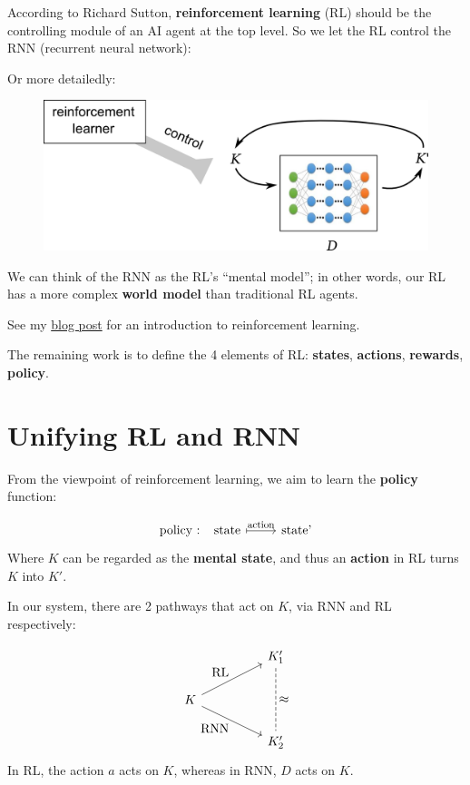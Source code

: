 \documentclass[12pt]{article}
\begin{document}
According to Richard Sutton, \textbf{reinforcement learning} (RL) should be the controlling module of an AI agent at the top level.  So we let the RL control the RNN (recurrent neural network):
\begin{center}
\end{center}

Or more detailedly:
\begin{figure}[H]
\centering
\includegraphics[scale=0.75]{genifer-model-0.png}
\end{figure}

We can think of the RNN as the RL's ``mental model'';  in other words, our RL has a more complex \textbf{world model} than traditional RL agents.

See my \href{http://geniferology.blogspot.hk/2015/05/what-is-reinforcement-learning.html}{blog post} for an introduction to reinforcement learning.

The remaining work is to define the 4 elements of RL: \textbf{states}, \textbf{actions}, \textbf{rewards}, \textbf{policy}.

\section{Unifying RL and RNN}

From the viewpoint of reinforcement learning, we aim to learn the \textbf{policy} function: \par
\begin{equation}
\begin{tikzcd}[]
\mbox{policy : ~~state} \arrow[r, mapsto, "\scalebox{0.8}{action}"] & \mbox{state'}
\end{tikzcd}
\end{equation}
Where $K$ can be regarded as the \textbf{mental state}, and thus an \textbf{action} in RL turns $K$ into $K'$.

In our system, there are 2 pathways that act on $K$, via RNN and RL respectively: \par
\begin{equation}
\begin{tikzcd}[column sep=huge]
& K'_1 \arrow[dd, dashed, no head, "\scalebox{1.3}{$\approx$}"] \\
K \arrow[ur, "\mbox{RL}"] \arrow[dr, "\mbox{RNN}"'] & \\
& K'_2
\end{tikzcd}
\end{equation}
In RL, the action $a$ acts on $K$, whereas in RNN, $D$ acts on $K$.
\end{document}
